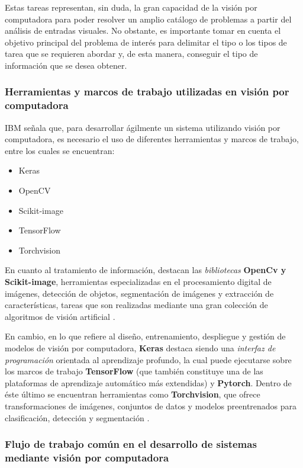 Estas tareas representan, sin duda, la gran capacidad de la visión por computadora para poder resolver un amplio catálogo de problemas a partir del análisis de entradas visuales. No obstante, es importante tomar en cuenta el objetivo principal del problema de interés para delimitar el tipo o los tipos de tarea que se requieren abordar y, de esta manera, conseguir el tipo de información que se desea obtener.

\subsubsection{Herramientas y marcos de trabajo utilizadas en visión por computadora}

IBM \cite{ibm_computer_vision} señala que, para desarrollar ágilmente un sistema utilizando visión por computadora, es necesario el uso de diferentes herramientas y marcos de trabajo, entre los cuales se encuentran:

\begin{itemize}
    \item Keras
    \item OpenCV
    \item Scikit-image
    \item TensorFlow
    \item Torchvision
\end{itemize}

En cuanto al tratamiento de información, destacan las \textit{bibliotecas} \textbf{OpenCv y Scikit-image}, herramientas especializadas en el procesamiento digital de imágenes, detección de objetos, segmentación de imágenes y extracción de características, tareas que son realizadas mediante una gran colección de algoritmos de visión artificial \cite{ibm_computer_vision}.

En cambio, en lo que refiere al diseño, entrenamiento, despliegue y gestión de modelos de visión por computadora, \textbf{Keras} destaca siendo una \textit{interfaz de programación} orientada al aprendizaje profundo, la cual puede ejecutarse sobre los marcos de trabajo \textbf{TensorFlow} (que también constituye una de las plataformas de aprendizaje automático más extendidas) y \textbf{Pytorch}. Dentro de éste último se encuentran herramientas como \textbf{Torchvision}, que ofrece transformaciones de imágenes, conjuntos de datos y modelos preentrenados para clasificación, detección y segmentación \cite{ibm_computer_vision}.

\subsubsection{Flujo de trabajo común en el desarrollo de sistemas mediante visión por computadora}

